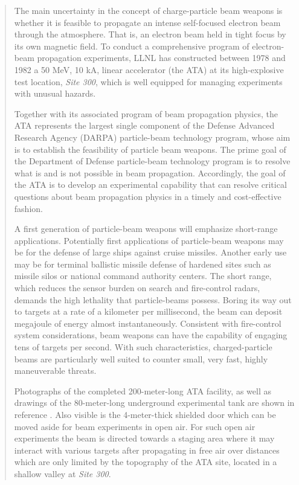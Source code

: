 \documentclass [12pt,a4paper,     ]{report} %
\begin{document}
\begin{quote}


The main uncertainty in the concept of charge-particle beam weapons is whether it is feasible to propagate an intense self-focused electron beam through the atmosphere.  That is, an electron beam held in tight focus by its own magnetic field.  To conduct a comprehensive program of electron-beam propagation experiments, LLNL has constructed between 1978 and 1982 a 50 MeV, 10 kA, linear accelerator (the ATA) at its high-explosive test location, \emph{Site 300}, which is well equipped for managing experiments with unusual hazards. 

Together with its associated program of beam propagation physics, the ATA represents the largest single component of the Defense Advanced Research Agency (DARPA) particle-beam technology program, whose aim is to establish the feasibility of particle beam weapons.  The prime goal of the Department of Defense particle-beam technology program is to resolve what is and is not possible in beam propagation.   Accordingly, the goal of the ATA is to develop an experimental capability that can resolve critical questions about beam propagation physics in a timely and cost-effective fashion.

A first generation of particle-beam weapons will emphasize short-range applications.  Potentially first applications  of particle-beam weapons may be for the defense of large ships against cruise missiles.  Another early use may be for terminal ballistic missile defense of hardened sites such as missile silos or national command authority centers.  The short range, which reduces the sensor burden on search and fire-control radars, demands the high lethality that particle-beams possess.  Boring its way out to targets at a rate of a kilometer per millisecond, the beam can deposit megajoule of energy almost instantaneously.  Consistent with fire-control system considerations, beam weapons can have the capability of engaging tens of targets per second.  With such characteristics, charged-particle beams are particularly well suited to counter small, very fast, highly maneuverable threats.

Photographs of the completed 200-meter-long ATA facility, as well as drawings of the 80-meter-long underground experimental tank are shown in reference \cite{BARLE1981B}.  Also visible is the 4-meter-thick shielded door which can be moved aside for beam experiments in open air.  For such open air experiments the beam is directed towards a staging area where it may interact with various targets after propagating in free air over distances which are only limited by the topography of the ATA site, located in a shallow valley at \emph{Site 300}.

\end{quote}
\end{document}
